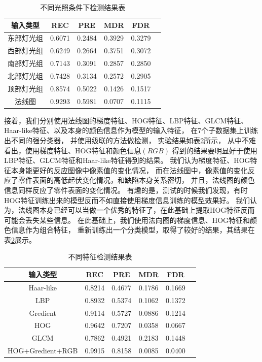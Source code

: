 \begin{table}
\centering
\begin{tabular}{cccccp{38mm}}
\toprule
\textbf{输入类型} & \textbf{REC} & \textbf{PRE} & \textbf{MDR} & \textbf{FDR}\\
\midrule
\mbox{东部灯光组} & 0.6071 & 0.2484 & 0.3929 & 0.3279\\
\mbox{西部灯光组} & 0.6249 & 0.2664 & 0.3751 & 0.3072\\
\mbox{南部灯光组} & 0.7143 & 0.3091 & 0.2857 & 0.2850\\
\mbox{北部灯光组} & 0.7428 & 0.3134 & 0.2572 & 0.2905\\
\mbox{顶部灯光组} & 0.8574 & 0.5022 & 0.1426 & 0.1517\\
\mbox{法线图} & 0.9293 & 0.5981 & 0.0707 & 0.1115\\
\bottomrule
\end{tabular}
\caption{不同光照条件下检测结果表}
\label{tab:butongguanzhaojiancejieguo}
\end{table}

接着，我们分别使用法线图的梯度特征、HOG特征、LBP特征、GLCM特征、Haar-like特征、以及本身的颜色信息作为模型的输入特征，
在7个子数据集上训练出不同的强分类器，
并使用级联的方法做检测，
实验结果如表\ref{tab:butongtezhengjieguobiao}所示，
从中不难看出，使用梯度特征、HOG特征和颜色信息$(RGB)$
得到的结果要明显好于使用LBP特征、GLCM特征和Haar-like特征得到的结果。
我们认为梯度特征、HOG特征本身能更好的反应图像中像素值的变化情况，
而在法线图中，像素值的变化反应了零件表面的高低起伏变化情况，和缺陷本身关系密切，
并且，法线图的颜色信息同样反应了零件表面的变化情况。
有趣的是，测试的时候我们发现，有时HOG特征训练出来的模型反而不如直接使用梯度信息训练的模型效果好。
我们认为，法线图本身已经可以当做一个优秀的特征了，在此基础上提取HOG特征反而可能会丢失某些信息。
在此基础上，我们使用法向图的梯度信息、HOG特征和颜色信息作为组合特征，
重新训练出一个分类模型，取得了较好的结果，其结果在表\ref{tab:butongtezhengjieguobiao}展示。

\begin{table}
\centering
\begin{tabular}{cccccp{38mm}}
\toprule
\textbf{输入类型} & \textbf{REC} & \textbf{PRE} & \textbf{MDR} & \textbf{FDR}\\
\midrule
\mbox{Haar-like} & 0.8214 & 0.4677 & 0.1786 & 0.1669\\
\mbox{LBP} & 0.8932 & 0.5374 & 0.1062 & 0.1372\\
\mbox{Gredient} & 0.9114 & 0.5727 & 0.0886 & 0.1214\\
\mbox{HOG} & 0.9642 & 0.7207 & 0.0358 & 0.0667\\
\mbox{GLCM} & 0.7862 & 0.4921 & 0.2183 & 0.1448\\
\mbox{HOG+Gredient+RGB} & 0.9915 & 0.8158 & 0.0085 & 0.0400\\
\bottomrule
\end{tabular}
\caption{不同特征检测结果表}
\label{tab:butongtezhengjieguobiao}
\end{table}

